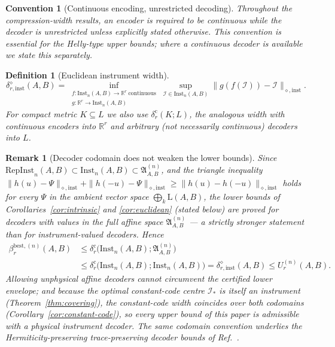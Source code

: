 \documentclass[11pt,a4paper]{article}
\newtheorem{definition}[theorem]{Definition}
\newtheorem{remark}[theorem]{Remark}
\newtheorem{convention}[theorem]{Convention}
\newcommand{\Lin}{\mathrm{L}}
\newcommand{\Inst}{\mathrm{Inst}}
\newcommand{\RepInst}{\mathrm{RepInst}}
\begin{document}
\begin{convention}[Continuous encoding, unrestricted decoding]
\label{conv:decoder}
Throughout the compression-width results, an encoder is required to be continuous while the decoder is unrestricted unless explicitly stated otherwise. This convention is essential for the Helly-type upper bounds; where a continuous decoder is available we state this separately.
\end{convention}

\begin{definition}[Euclidean instrument width]
\label{def:width}
\[
\delta_{r,\mathrm{inst}}^{\diamond}(A,B)
=\inf_{\substack{f:\Inst_n(A,B)\to\mathbb R^r\ \text{continuous}\\ g:\mathbb R^r\to\Inst_n(A,B)}}
\sup_{\mathcal I\in\Inst_n(A,B)}
\|g(f(\mathcal I))-\mathcal I\|_{\diamond,\mathrm{inst}}.
\]
For compact metric $K\subseteq L$ we also use $\delta_r^{\mathrm c}(K;L)$, the analogous width with continuous encoders into $\mathbb R^r$ and arbitrary (not necessarily continuous) decoders into $L$.
\end{definition}

\begin{remark}[Decoder codomain does not weaken the lower bounds]
\label{rem:decoder-codomain}
Since $\RepInst_n(A,B)\subset\Inst_n(A,B)\subset\mathfrak A_{A,B}^{(n)}$, and the triangle inequality $\|h(u)-\Psi\|_{\diamond,\mathrm{inst}}+\|h(-u)-\Psi\|_{\diamond,\mathrm{inst}}\ge\|h(u)-h(-u)\|_{\diamond,\mathrm{inst}}$ holds for every $\Psi$ in the ambient vector space $\bigoplus_k\Lin(A,B)$, the lower bounds of Corollaries~\ref{cor:intrinsic} and \ref{cor:euclidean} (stated below) are proved for decoders with values in the full affine space $\mathfrak A_{A,B}^{(n)}$ --- a strictly stronger statement than for instrument-valued decoders. Hence
\begin{align*}
\beta_r^{\mathrm{best},(n)}(A,B)
&\le\delta_r^{\mathrm c}\big(\Inst_n(A,B);\mathfrak A_{A,B}^{(n)}\big)\\
&\le\delta_r^{\mathrm c}\big(\Inst_n(A,B);\Inst_n(A,B)\big)
=\delta_{r,\mathrm{inst}}^{\diamond}(A,B)
\le U_r^{(n)}(A,B).
\end{align*}
Allowing unphysical affine decoders cannot circumvent the certified lower envelope; and because the optimal constant-code centre $\mathcal I_*$ is itself an instrument (Theorem~\ref{thm:covering}), the constant-code width coincides over both codomains (Corollary~\ref{cor:constant-code}), so every upper bound of this paper is admissible with a physical instrument decoder. The same codomain convention underlies the Hermiticity-preserving trace-preserving decoder bounds of Ref.~\cite{CompanionChannels}.
\end{remark}
\end{document}
